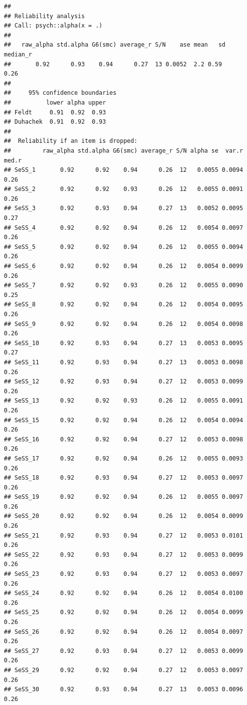 \documentclass[
]{article}
\begin{document}
\begin{verbatim}
## 
## Reliability analysis   
## Call: psych::alpha(x = .)
## 
##   raw_alpha std.alpha G6(smc) average_r S/N    ase mean   sd median_r
##       0.92      0.93    0.94      0.27  13 0.0052  2.2 0.59     0.26
## 
##     95% confidence boundaries 
##          lower alpha upper
## Feldt     0.91  0.92  0.93
## Duhachek  0.91  0.92  0.93
## 
##  Reliability if an item is dropped:
##         raw_alpha std.alpha G6(smc) average_r S/N alpha se  var.r med.r
## SeSS_1       0.92      0.92    0.94      0.26  12   0.0055 0.0094  0.26
## SeSS_2       0.92      0.92    0.93      0.26  12   0.0055 0.0091  0.26
## SeSS_3       0.92      0.93    0.94      0.27  13   0.0052 0.0095  0.27
## SeSS_4       0.92      0.92    0.94      0.26  12   0.0054 0.0097  0.26
## SeSS_5       0.92      0.92    0.94      0.26  12   0.0055 0.0094  0.26
## SeSS_6       0.92      0.92    0.94      0.26  12   0.0054 0.0099  0.26
## SeSS_7       0.92      0.92    0.93      0.26  12   0.0055 0.0090  0.25
## SeSS_8       0.92      0.92    0.94      0.26  12   0.0054 0.0095  0.26
## SeSS_9       0.92      0.92    0.94      0.26  12   0.0054 0.0098  0.26
## SeSS_10      0.92      0.93    0.94      0.27  13   0.0053 0.0095  0.27
## SeSS_11      0.92      0.93    0.94      0.27  13   0.0053 0.0098  0.26
## SeSS_12      0.92      0.93    0.94      0.27  12   0.0053 0.0099  0.26
## SeSS_13      0.92      0.92    0.93      0.26  12   0.0055 0.0091  0.26
## SeSS_15      0.92      0.92    0.94      0.26  12   0.0054 0.0094  0.26
## SeSS_16      0.92      0.92    0.94      0.27  12   0.0053 0.0098  0.26
## SeSS_17      0.92      0.92    0.94      0.26  12   0.0055 0.0093  0.26
## SeSS_18      0.92      0.93    0.94      0.27  12   0.0053 0.0097  0.26
## SeSS_19      0.92      0.92    0.94      0.26  12   0.0055 0.0097  0.26
## SeSS_20      0.92      0.92    0.94      0.26  12   0.0054 0.0099  0.26
## SeSS_21      0.92      0.93    0.94      0.27  12   0.0053 0.0101  0.26
## SeSS_22      0.92      0.93    0.94      0.27  12   0.0053 0.0099  0.26
## SeSS_23      0.92      0.93    0.94      0.27  12   0.0053 0.0097  0.26
## SeSS_24      0.92      0.92    0.94      0.26  12   0.0054 0.0100  0.26
## SeSS_25      0.92      0.92    0.94      0.26  12   0.0054 0.0099  0.26
## SeSS_26      0.92      0.92    0.94      0.26  12   0.0054 0.0097  0.26
## SeSS_27      0.92      0.93    0.94      0.27  12   0.0053 0.0099  0.26
## SeSS_29      0.92      0.92    0.94      0.27  12   0.0053 0.0097  0.26
## SeSS_30      0.92      0.93    0.94      0.27  13   0.0053 0.0096  0.26

\end{verbatim}
\end{document}
